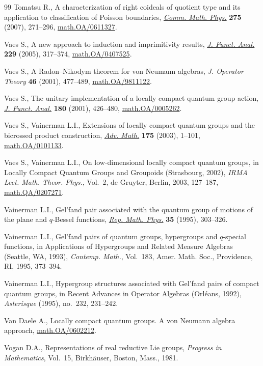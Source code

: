 \documentclass[11pt]{article}
\numberwithin{equation}{section}
\theoremstyle{definition}
\begin{document}
\begin{thebibliography}{99}
 Tomatsu  R.,
  A characterization of right coideals of quotient type and its application to classif\/ication of Poisson boundaries,
\href{http://dx.doi.org/10.1007/s00220-007-0267-6}{\emph{Comm. Math. Phys.}} {\bf 275} (2007), 271--296,
\href{http://arxiv.org/abs/math.OA/0611327}{math.OA/0611327}.

    Vaes S.,
   A new approach to induction and imprimitivity results,
\href{http://dx.doi.org/10.1016/j.jfa.2004.11.016}{\emph{J. Funct. Anal.}} {\bf 229} (2005), 317--374,
\href{http://arxiv.org/abs/math.OA/0407525}{math.OA/0407525}.

  Vaes S.,
  A Radon--Nikodym theorem for von Neumann algebras,
  \emph{J. Operator Theory} {\bf 46} (2001), 477--489,
  \href{http://arxiv.org/abs/math.OA/9811122}{math.OA/9811122}.

  Vaes  S.,
    The unitary implementation of a locally compact quantum group action,
\href{http://dx.doi.org/10.1006/jfan.2000.3704}{\emph{J. Funct. Anal.}} {\bf 180} (2001), 426--480,
\href{http://arxiv.org/abs/math.OA/0005262}{math.OA/0005262}.

    Vaes S., Vainerman L.I.,
   Extensions of locally compact quantum groups and the bicrossed product construction,
\href{http://dx.doi.org/10.1016/S0001-8708(02)00040-3}{\emph{Adv. Math.}} {\bf 175} (2003), 1--101,
\href{http://arxiv.org/abs/math.OA/0101133}{math.OA/0101133}.

   Vaes  S., Vainerman L.I.,
    On low-dimensional locally compact quantum groups,
    in Locally Compact Quantum Groups and Groupoids (Strasbourg, 2002), {\it IRMA Lect. Math. Theor. Phys.}, Vol.~2, de Gruyter, Berlin, 2003, 127--187,
\href{http://arxiv.org/abs/math.QA/0207271}{math.QA/0207271}.

   Vainerman  L.I.,
    Gel'fand pair associated with the quantum group of motions of the plane and $q$-Bessel functions,
\href{http://dx.doi.org/10.1016/0034-4877(96)89291-3}{\emph{Rep. Math. Phys.}} {\bf 35} (1995), 303--326.

    Vainerman L.I.,
   Gel'fand pairs of quantum groups, hypergroups and $q$-special functions,
in Applications of Hypergroups and Related Measure Algebras (Seattle, WA, 1993), {\it  Contemp. Math.}, Vol.~183, Amer. Math. Soc., Providence, RI, 1995, 373--394.

   Vainerman  L.I.,
    Hypergroup structures associated with Gel'fand pairs of compact quantum groups,
    in  Recent Advances in Operator Algebras (Orl\'eans, 1992),
    {\it Asterisque} (1995),  no.~232, 231--242.

 Van Daele  A.,
  Locally compact quantum groups. A von Neumann algebra approach,
\href{http://arxiv.org/abs/math.OA/06022121}{math.OA/0602212}.

  Vogan D.A.,
   Representations of real reductive Lie groups,
{\it Progress in Mathematics}, Vol.~15, Birkh\"auser, Boston, Mass., 1981.

\end{thebibliography}
\end{document}
